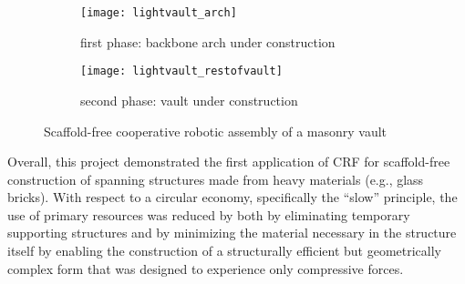     \begin{figure}[H]
        \centering
        \begin{subfigure}{.49\textwidth}
            \centering
            \texttt{[image: lightvault\_arch]}
            \caption{first phase: backbone arch under construction}
            \label{fig:lightvault_arch}
        \end{subfigure}
        \begin{subfigure}{.49\textwidth}
            \centering
            \texttt{[image: lightvault\_restofvault]}
            \caption{second phase: vault under construction}
            \label{fig:lightvault_full}
        \end{subfigure}
        \caption{Scaffold-free cooperative robotic assembly of a masonry vault}
        \label{fig:lightvault}
    \end{figure}  

    Overall, this project demonstrated the first application of CRF for scaffold-free construction of spanning structures made from heavy materials (e.g., glass bricks). With respect to a circular economy, specifically the ``slow'' principle, the use of primary resources was reduced by both by eliminating temporary supporting structures and by minimizing the material necessary in the structure itself by enabling the construction of a structurally efficient but geometrically complex form that was designed to experience only compressive forces.


